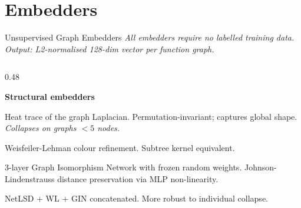 \documentclass[aspectratio=169,10pt]{beamer}
\begin{document}

\section{Embedders}

\begin{frame}{Unsupervised Graph Embedders}
\textit{All embedders require no labelled training data.
Output: L2-normalised 128-dim vector per function graph.}

\vspace{0.5em}
\begin{columns}[T]
\begin{column}{0.48\textwidth}

  \textbf{\textcolor{c1}{Structural embedders}}
  \begin{description}
    \item[\textbf{NetLSD}] Heat trace of the graph Laplacian.
      Permutation-invariant; captures global shape.
      \textit{Collapses on graphs $<5$ nodes.}
    \item[\textbf{WL}] Weisfeiler-Lehman colour refinement. Subtree kernel equivalent.
    \item[\textbf{GIN}] 3-layer Graph Isomorphism Network with
      frozen random weights. Johnson-Lindenstrauss
      distance preservation via MLP non-linearity.
    \item[\textbf{Combined}] NetLSD + WL + GIN concatenated.
    More robust to individual collapse.
  \end{description}

\end{column}



\end{columns}
\end{frame}
\end{document}
